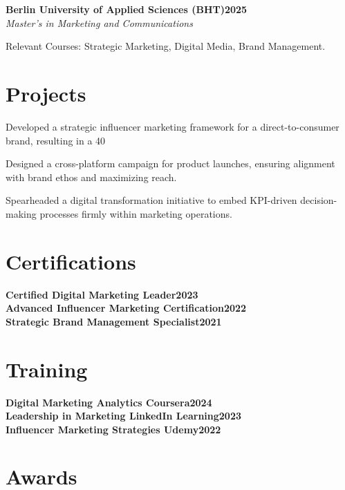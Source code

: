 \documentclass[letterpaper,10pt]{article}
\newcommand{\heading}[2]{
  \hspace{10pt}#1\hfill#2\\
}
\newcommand{\headingBf}[2]{
  \heading{\textbf{#1}}{\textbf{#2}}
}
\newcommand{\headingIt}[2]{
  \heading{\textit{#1}}{\textit{#2}}
}
\newenvironment{resume_list}{
  \vspace{-7pt}
  \begin{itemize}[itemsep=-2px, parsep=1pt, leftmargin=20pt, labelsep=10pt]
}{
  \end{itemize}
}
\begin{document}
\headingBf{Berlin University of Applied Sciences (BHT)}{2025}
\headingIt{Master's in Marketing and Communications}{}
\begin{resume_list}
  \item Relevant Courses: Strategic Marketing, Digital Media, Brand Management.
\end{resume_list}

\vspace{-1em}

\section{Projects}

\begin{resume_list}
    \item Developed a strategic influencer marketing framework for a direct-to-consumer brand, resulting in a 40%
    \item Designed a cross-platform campaign for product launches, ensuring alignment with brand ethos and maximizing reach.
    \item Spearheaded a digital transformation initiative to embed KPI-driven decision-making processes firmly within marketing operations.
\end{resume_list}

\vspace{-1em}

\section{Certifications}

\headingBf{Certified Digital Marketing Leader}{2023}
\headingBf{Advanced Influencer Marketing Certification}{2022}
\headingBf{Strategic Brand Management Specialist}{2021}

\vspace{-0.5em}

\section{Training}
\headingBf{Digital Marketing Analytics \textnormal{Coursera}}{2024}
\headingBf{Leadership in Marketing \textnormal{LinkedIn Learning}}{2023}
\headingBf{Influencer Marketing Strategies \textnormal{Udemy}}{2022}

\vspace{-0.5em}

\section{Awards}
\end{document}
